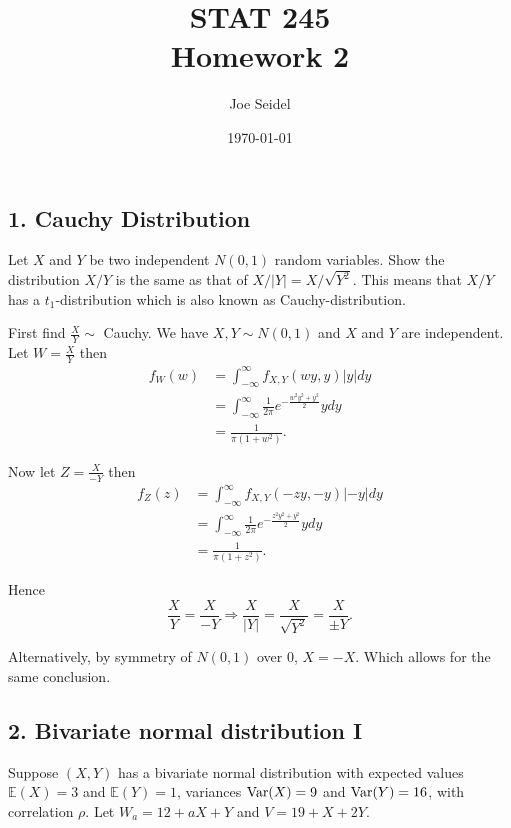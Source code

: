 \documentclass{tufte-book}
\title{STAT  245\\Homework 2}
\author{Joe Seidel}
\date{\today}
\begin{document}
\maketitle
{}
\newpage
{}

\subsection{1. Cauchy Distribution}
Let $X$ and $Y$ be two independent $N(0,1)$ random variables.  Show the distribution $X/Y$ is the same as that of $X/|Y|=X/\sqrt{Y^2}$.  This means that $X/Y$ has a $t_1$-distribution which is also known as Cauchy-distribution.

First find $\frac{X}{Y} \sim$ Cauchy.  We have $X,Y \sim N(0,1)$ and $X$ and $Y$ are independent.  Let $W=\frac{X}{Y}$ then
\begin{align*}
f_W(w) &= \int_{-\infty}^{\infty}f_{X,Y}(wy,y)|y|dy \\
&= \int_{-\infty}^{\infty} \frac{1}{2\pi}e^{-\frac{w^2y^2 +y^2}{2}}ydy\\
&= \frac{1}{\pi(1+w^2)}.
\end{align*}

Now let $Z=\frac{X}{-Y}$ then
\begin{align*}
f_Z(z) &= \int_{-\infty}^{\infty}f_{X,Y}(-zy,-y)|-y|dy \\
&= \int_{-\infty}^{\infty} \frac{1}{2\pi}e^{-\frac{z^2y^2 +y^2}{2}}ydy\\
&= \frac{1}{\pi(1+z^2)}.
\end{align*}

Hence
\[ \frac{X}{Y}=\frac{X}{-Y}\Rightarrow \frac{X}{|Y|}=\frac{X}{\sqrt{Y^2}}=\frac{X}{\pm Y}. \]

Alternatively, by symmetry of $N(0,1)$ over $0$, $X=-X$.  Which allows for the same conclusion.


\subsection{2. Bivariate normal distribution I} Suppose $(X,Y)$ has a bivariate normal distribution with expected values $\mathbb{E}(X)=3$ and $\mathbb{E}(Y)=1$, variances $\operatorname{Var}(X)=9$ and $\operatorname{Var}(Y)=16$, with correlation $\rho$.  Let $W_a=12+aX+Y$ and $V=19+X+2Y$.
\end{document}
